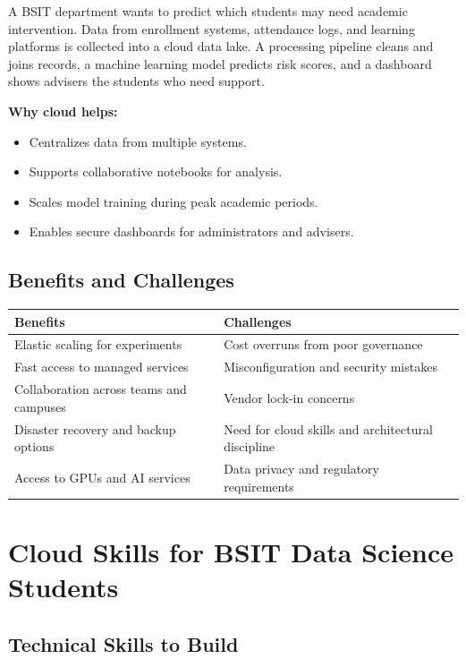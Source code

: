 \documentclass[11pt,a4paper]{article}
\begin{document}
\begin{examplebox}[Scenario]
A BSIT department wants to predict which students may need academic intervention. Data from enrollment systems, attendance logs, and learning platforms is collected into a cloud data lake. A processing pipeline cleans and joins records, a machine learning model predicts risk scores, and a dashboard shows advisers the students who need support.
\end{examplebox}

\textbf{Why cloud helps:}
\begin{itemize}[leftmargin=*]
  \item Centralizes data from multiple systems.
  \item Supports collaborative notebooks for analysis.
  \item Scales model training during peak academic periods.
  \item Enables secure dashboards for administrators and advisers.
\end{itemize}

\subsection{Benefits and Challenges}

\begin{longtable}{p{5.9cm}p{5.9cm}}
\toprule
\textbf{Benefits} & \textbf{Challenges} \\
\midrule
Elastic scaling for experiments & Cost overruns from poor governance \\
Fast access to managed services & Misconfiguration and security mistakes \\
Collaboration across teams and campuses & Vendor lock-in concerns \\
Disaster recovery and backup options & Need for cloud skills and architectural discipline \\
Access to GPUs and AI services & Data privacy and regulatory requirements \\
\bottomrule
\end{longtable}

\section{Cloud Skills for BSIT Data Science Students}

\subsection{Technical Skills to Build}
\end{document}
